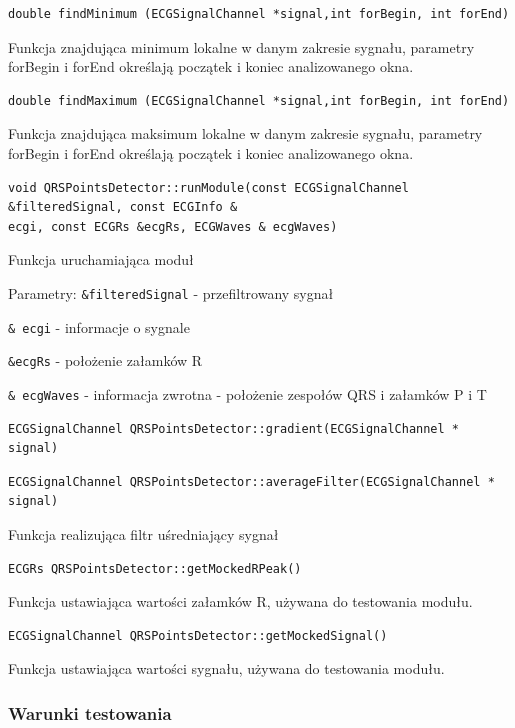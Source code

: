 \documentclass[a4paper, 11pt]{article}
\begin{document}
\begin{lstlisting}
double findMinimum (ECGSignalChannel *signal,int forBegin, int forEnd)
\end{lstlisting}
Funkcja znajdująca minimum lokalne w danym zakresie sygnału, parametry forBegin i forEnd
określają początek i koniec analizowanego okna.

\begin{lstlisting}
double findMaximum (ECGSignalChannel *signal,int forBegin, int forEnd)
\end{lstlisting}
Funkcja znajdująca maksimum lokalne w danym zakresie sygnału, parametry forBegin i forEnd
określają początek i koniec analizowanego okna.

\begin{lstlisting}
void QRSPointsDetector::runModule(const ECGSignalChannel &filteredSignal, const ECGInfo &
ecgi, const ECGRs &ecgRs, ECGWaves & ecgWaves)
\end{lstlisting}
Funkcja uruchamiająca moduł

Parametry:
\verb|&filteredSignal| - przefiltrowany sygnał

\verb|& ecgi| - informacje o sygnale

\verb|&ecgRs| - położenie załamków R

\verb|& ecgWaves| - informacja zwrotna - położenie zespołów QRS i załamków P i T

\begin{lstlisting}
ECGSignalChannel QRSPointsDetector::gradient(ECGSignalChannel * signal)
\end{lstlisting}

\begin{lstlisting}
ECGSignalChannel QRSPointsDetector::averageFilter(ECGSignalChannel * signal)
\end{lstlisting}

Funkcja realizująca filtr uśredniający sygnał

\begin{lstlisting}
ECGRs QRSPointsDetector::getMockedRPeak()
\end{lstlisting}
Funkcja ustawiająca wartości załamków R, używana do testowania modułu.

\begin{lstlisting}
ECGSignalChannel QRSPointsDetector::getMockedSignal()
\end{lstlisting}
Funkcja ustawiająca wartości sygnału, używana do testowania modułu.



\subsubsection{Warunki testowania}
\label{sec:st_interval:tests}
\end{document}
